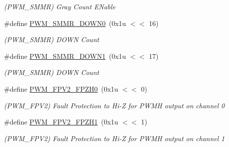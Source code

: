 \begin{DoxyCompactItemize}
\begin{DoxyCompactList}\small\item\em (P\+W\+M\+\_\+\+S\+M\+MR) Gray Count E\+Nable \end{DoxyCompactList}\item 
\mbox{\label{group__SAMV71__PWM_ga761056425aa02bd82bc39edfd3c0be2a}} 
\#define \mbox{\hyperlink{group__SAMV71__PWM_ga761056425aa02bd82bc39edfd3c0be2a}{P\+W\+M\+\_\+\+S\+M\+M\+R\+\_\+\+D\+O\+W\+N0}}~(0x1u $<$$<$ 16)
\begin{DoxyCompactList}\small\item\em (P\+W\+M\+\_\+\+S\+M\+MR) D\+O\+WN Count \end{DoxyCompactList}\item 
\mbox{\label{group__SAMV71__PWM_ga9fac8e2f4988eb9487755679b524baea}} 
\#define \mbox{\hyperlink{group__SAMV71__PWM_ga9fac8e2f4988eb9487755679b524baea}{P\+W\+M\+\_\+\+S\+M\+M\+R\+\_\+\+D\+O\+W\+N1}}~(0x1u $<$$<$ 17)
\begin{DoxyCompactList}\small\item\em (P\+W\+M\+\_\+\+S\+M\+MR) D\+O\+WN Count \end{DoxyCompactList}\item 
\mbox{\label{group__SAMV71__PWM_gaf40bdd04578cb341f6d6d1f02db82135}} 
\#define \mbox{\hyperlink{group__SAMV71__PWM_gaf40bdd04578cb341f6d6d1f02db82135}{P\+W\+M\+\_\+\+F\+P\+V2\+\_\+\+F\+P\+Z\+H0}}~(0x1u $<$$<$ 0)
\begin{DoxyCompactList}\small\item\em (P\+W\+M\+\_\+\+F\+P\+V2) Fault Protection to Hi-\/Z for P\+W\+MH output on channel 0 \end{DoxyCompactList}\item 
\mbox{\label{group__SAMV71__PWM_ga00852771fbfc71aff94b61036421cef2}} 
\#define \mbox{\hyperlink{group__SAMV71__PWM_ga00852771fbfc71aff94b61036421cef2}{P\+W\+M\+\_\+\+F\+P\+V2\+\_\+\+F\+P\+Z\+H1}}~(0x1u $<$$<$ 1)
\begin{DoxyCompactList}\small\item\em (P\+W\+M\+\_\+\+F\+P\+V2) Fault Protection to Hi-\/Z for P\+W\+MH output on channel 1 \end{DoxyCompactList}\item 
\mbox{\label{group__SAMV71__PWM_gabdd5ede76d1d9f0eb5df161a76c9aa33}} 

\end{DoxyCompactItemize}
